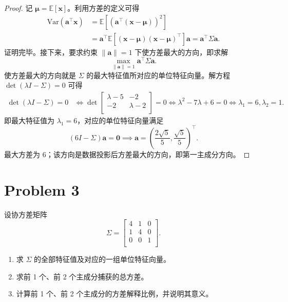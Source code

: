 \begin{proof}
记 $\boldsymbol{\mu}=\mathbb E[\boldsymbol x]$。利用方差的定义可得 \[
\begin{aligned}
    \mathrm{Var} \left(\boldsymbol{a}^\top \boldsymbol{x} \right)
    &= \mathbb{E} \left[ \left( \boldsymbol{a}^\top(\boldsymbol{x}-\boldsymbol\mu) \right)^2 \right] \\
    &= \boldsymbol a^\top\mathbb E\left[(\boldsymbol{x}-\boldsymbol\mu)(\boldsymbol{x}-\boldsymbol\mu)^\top\right]\boldsymbol a
    =\boldsymbol a^\top\Sigma\boldsymbol a.
\end{aligned}
\]
证明完毕。接下来，要求约束 $\left\|\boldsymbol{a}\right\| = 1$ 下使方差最大的方向，即求解 \[\max_{\left\|\boldsymbol{a}\right\| = 1} \boldsymbol{a}^\top \Sigma \boldsymbol{a}.\]
使方差最大的方向就是 $\Sigma$ 的最大特征值所对应的单位特征向量。解方程 $\det \left(\lambda I - \Sigma\right) = 0$ 可得 \[\begin{aligned}
    \det \left(\lambda I - \Sigma\right) = 0 &\iff \det\begin{bmatrix}
        \lambda - 5 & -2 \\
        -2 & \lambda - 2 \\
    \end{bmatrix} = 0 \iff \lambda^2 - 7 \lambda + 6 = 0 \iff \boxed{\lambda_1 = 6, \lambda_2 = 1}.
\end{aligned}\]
即最大特征值为 $\lambda_1 = 6$，对应的单位特征向量满足 \[\left(6 I - \Sigma\right) \boldsymbol{a} = \boldsymbol{0} \implies \boxed{\boldsymbol{a} = \left(\frac{2\sqrt{5}}{5}, \frac{\sqrt{5}}{5}\right)^\top}.\]
最大方差为 $\boxed{6}$；该方向是数据投影后方差最大的方向，即第一主成分方向。
\end{proof}

\section*{Problem 3}

设协方差矩阵 \[\Sigma = \begin{bmatrix}
    4 & 1 & 0 \\
    1 & 4 & 0 \\
    0 & 0 & 1 \\
\end{bmatrix}.\]
\begin{enumerate}
    \item 求 $\Sigma$ 的全部特征值及对应的一组单位特征向量。
    \item 求前 1 个、前 2 个主成分捕获的总方差。
    \item 计算前 1 个、前 2 个主成分的方差解释比例，并说明其意义。
\end{enumerate}

